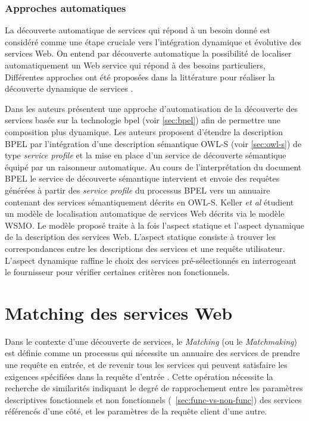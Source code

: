     \subsubsection{Approches automatiques}
    \label{ws-desc:auto}
    La découverte automatique de services qui répond à un besoin donné
    est considéré comme une étape cruciale vers l'intégration
    dynamique et évolutive des services Web. On entend par découverte
    automatique la possibilité de localiser automatiquement un Web
    service qui répond à des besoins particuliers, Différentes
    approches ont été proposées dans la littérature pour réaliser la
    découverte dynamique de services \cite{paolucci2002semantic,
      bernstein2002discovering, mandell2003bottom,
      benatallah2005automating,keller2005automatic}.

    Dans \cite{mandell2003bottom} les auteurs présentent une approche
    d'automatisation de la découverte des services basée sur la
    technologie \acrshort{bpel} (voir \ref{sec:bpel}) afin de
    permettre une composition plus dynamique. Les auteurs proposent
    d'étendre la description \textsc{BPEL} par l'intégration d'une
    description sémantique \textsc{OWL-S} (voir \ref{sec:owl-s}) de
    type \textit{service profile} et la mise en place d'un service de
    découverte sémantique équipé par un raisonneur automatique. Au
    cours de l'interprétation du document \textsc{BPEL} le service de
    découverte sémantique intervient et envoie des requêtes générées à
    partir des \textit{service profile} du processus \textsc{ BPEL}
    vers un annuaire contenant des services sémantiquement décrits en
    \textsc{OWL-S}.
    Keller \textit{et al} \cite{keller2005automatic} étudient un
    modèle de localisation automatique de services Web décrits via le
    modèle \textsc{WSMO}. Le modèle proposé traite à la fois l'aspect
    statique et l'aspect dynamique de la description des services
    Web. L'aspect statique consiste à trouver les correspondances
    entre les descriptions des services et une requête
    utilisateur. L'aspect dynamique raffine le choix des services
    pré-sélectionnés en interrogeant le fournisseur pour vérifier
    certaines critères non fonctionnels.

\section{Matching des services Web}
\label{sec:ws-matching}
Dans le contexte d'une découverte de services, le \textit{Matching}
(ou le \textit{Matchmaking}) est définie comme un processus qui
nécessite un annuaire des services de prendre une requête en entrée,
et de revenir tous les services qui peuvent satisfaire les exigences
spécifiées dans la requête d'entrée \cite{li2004software}. Cette
opération nécessite la recherche de similarités indiquant le degré de
rapprochement entre les paramètres descriptives fonctionnels et
non fonctionnels (~\ref{sec:func-vs-non-func}) des services référencés
d'une côté, et les paramètres de la requête client d'une autre.

